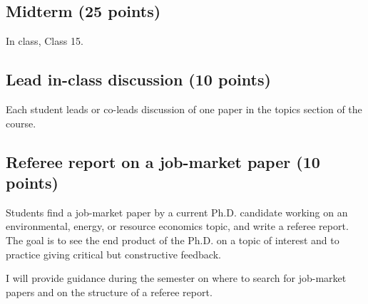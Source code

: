 \subsection*{Midterm (25 points)}
In class, Class 15.

\subsection*{Lead in-class discussion (10 points)}
Each student leads or co-leads discussion of one paper in the topics section of the course.

\subsection*{Referee report on a job-market paper (10 points)}
Students find a job-market paper by a current Ph.D. candidate working on an environmental, energy, or resource economics topic, and write a referee report. The goal is to see the end product of the Ph.D. on a topic of interest and to practice giving critical but constructive feedback.

\noindent I will provide guidance during the semester on where to search for job-market papers and on the structure of a referee report.
